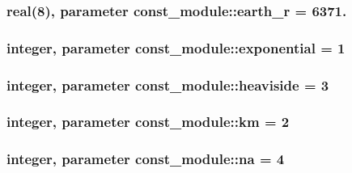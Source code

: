 \subsubsection[{earth\+\_\+r}]{\setlength{\rightskip}{0pt plus 5cm}real(8), parameter const\+\_\+module\+::earth\+\_\+r = 6371.}\label{namespaceconst__module_ab766035166a55b031df25669f66e7b06}
\hypertarget{namespaceconst__module_a7b2347a542b2eda2b6841e1d9fdf19f4}{}
\subsubsection[{exponential}]{\setlength{\rightskip}{0pt plus 5cm}integer, parameter const\+\_\+module\+::exponential = 1}\label{namespaceconst__module_a7b2347a542b2eda2b6841e1d9fdf19f4}
\hypertarget{namespaceconst__module_a0a0ee9e64316ae52e9c539987c5d18d5}{}
\subsubsection[{heaviside}]{\setlength{\rightskip}{0pt plus 5cm}integer, parameter const\+\_\+module\+::heaviside = 3}\label{namespaceconst__module_a0a0ee9e64316ae52e9c539987c5d18d5}
\hypertarget{namespaceconst__module_a4e8504d7945ca96447c578c95644bd5a}{}
\subsubsection[{km}]{\setlength{\rightskip}{0pt plus 5cm}integer, parameter const\+\_\+module\+::km = 2}\label{namespaceconst__module_a4e8504d7945ca96447c578c95644bd5a}
\hypertarget{namespaceconst__module_a437f551584bfdf420d4b28c829759eb5}{}
\subsubsection[{na}]{\setlength{\rightskip}{0pt plus 5cm}integer, parameter const\+\_\+module\+::na = 4}\label{namespaceconst__module_a437f551584bfdf420d4b28c829759eb5}
\hypertarget{namespaceconst__module_a45c7ab4515e2c0068ca69e5f4fed8a51}{}
